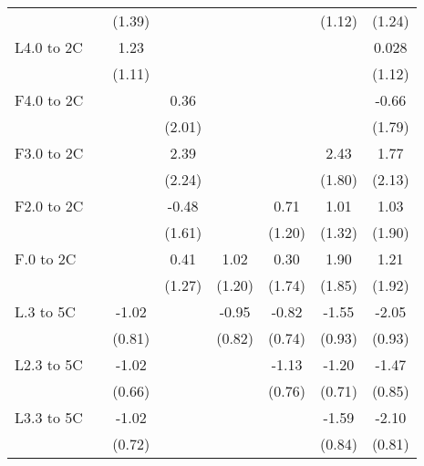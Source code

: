 \documentclass[paper=letterpaper, fontsize=11pt]{article} %
\begin{document}
{\begin{landscape}
\begin{longtable}{l*{7}{c}}
                    &            &      (1.39)&            &            &            &      (1.12)&      (1.24)\\
L4.0 to 2C          &            &        1.23&            &            &            &            &       0.028\\
                    &            &      (1.11)&            &            &            &            &      (1.12)\\
F4.0 to 2C          &            &            &        0.36&            &            &            &       -0.66\\
                    &            &            &      (2.01)&            &            &            &      (1.79)\\
F3.0 to 2C          &            &            &        2.39&            &            &        2.43&        1.77\\
                    &            &            &      (2.24)&            &            &      (1.80)&      (2.13)\\
F2.0 to 2C          &            &            &       -0.48&            &        0.71&        1.01&        1.03\\
                    &            &            &      (1.61)&            &      (1.20)&      (1.32)&      (1.90)\\
F.0 to 2C           &            &            &        0.41&        1.02&        0.30&        1.90&        1.21\\
                    &            &            &      (1.27)&      (1.20)&      (1.74)&      (1.85)&      (1.92)\\
L.3 to 5C           &            &       -1.02&            &       -0.95&       -0.82&       -1.55&       -2.05\\
                    &            &      (0.81)&            &      (0.82)&      (0.74)&      (0.93)&      (0.93)\\
L2.3 to 5C          &            &       -1.02&            &            &       -1.13&       -1.20&       -1.47\\
                    &            &      (0.66)&            &            &      (0.76)&      (0.71)&      (0.85)\\
L3.3 to 5C          &            &       -1.02&            &            &            &       -1.59&       -2.10\\
                    &            &      (0.72)&            &            &            &      (0.84)&      (0.81)\\

\end{longtable}
\end{landscape}}
\end{document}
